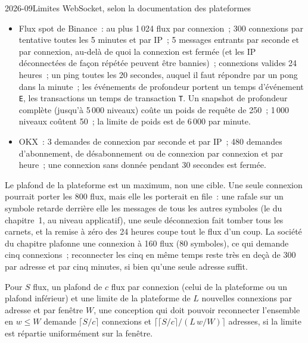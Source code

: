 \begin{dated}{2026-09}{Limites WebSocket, selon la documentation des plateformes}\label{dat:nw:api-engineering-for-crypto-venues:limits}
\begin{itemize}
\item Flux spot de Binance~: au plus 1\,024 flux par connexion~; 300 connexions par tentative toutes les 5 minutes et par IP~; 5 messages entrants par
  seconde et par connexion, au-delà de quoi la connexion est fermée (et les IP déconnectées de façon répétée peuvent être bannies)~; connexions valides 24 heures~; un ping
  toutes les 20 secondes, auquel il faut répondre par un pong dans la minute~; les événements de profondeur portent un temps d'événement \texttt{E}, les transactions un temps de transaction \texttt{T}. Un
  snapshot de profondeur complète (jusqu'à 5\,000 niveaux) coûte un poids de requête de 250~; 1\,000 niveaux coûtent 50~; la limite de poids est de 6\,000 par minute.
\item OKX~: 3 demandes de connexion par seconde et par IP~; 480 demandes d'abonnement, de désabonnement ou de connexion par connexion et par heure~; une connexion sans donnée
  pendant 30 secondes est fermée.
\end{itemize}
\end{dated}

Le plafond de la plateforme est un maximum, non une cible. Une seule connexion pourrait porter les 800 flux, mais elle les porterait en file~: une rafale sur un symbole
retarde derrière elle les messages de tous les autres symboles (le  du chapitre~1, au niveau applicatif), une seule déconnexion fait tomber tous les carnets, et
la remise à zéro des 24 heures coupe tout le flux d'un coup. La société du chapitre plafonne une connexion à 160 flux (80 symboles), ce qui demande cinq
connexions~; reconnecter les cinq en même temps reste très en deçà de 300 par adresse et par cinq minutes, si bien qu'une seule adresse suffit.

\begin{proposition}\label{prop:nw:api-engineering-for-crypto-venues:shards}
Pour $S$ flux, un plafond de $c$ flux par connexion (celui de la plateforme ou un plafond inférieur) et une limite de la plateforme de $L$ nouvelles connexions par adresse et par fenêtre $W$,
une conception qui doit pouvoir reconnecter l'ensemble en $w \le W$ demande $\lceil S/c \rceil$ connexions et $\lceil \lceil S/c \rceil / (L\,w/W)
\rceil$ adresses, si la limite est répartie uniformément sur la fenêtre.
\end{proposition}

